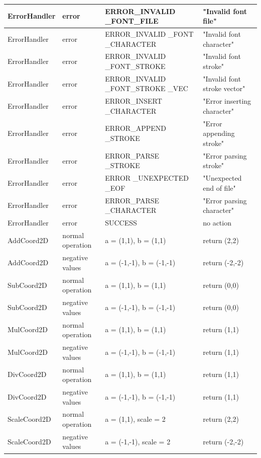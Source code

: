 \begin{longtable}{|>{\raggedright\arraybackslash}m{}|>{\raggedright\arraybackslash}m{}|>{\raggedright\arraybackslash}m{}|>{\raggedright\arraybackslash}m{}|}
        ErrorHandler & error & ERROR\_INVALID \_FONT\_FILE  & "Invalid font file" \\ \hline
        ErrorHandler & error & ERROR\_INVALID \_FONT \_CHARACTER  & "Invalid font character" \\ \hline
        ErrorHandler & error & ERROR\_INVALID \_FONT\_STROKE  & "Invalid font stroke" \\ \hline
        ErrorHandler & error & ERROR\_INVALID \_FONT\_STROKE \_VEC  & "Invalid font stroke vector" \\ \hline
        ErrorHandler & error & ERROR\_INSERT \_CHARACTER  & "Error inserting character" \\ \hline
        ErrorHandler & error & ERROR\_APPEND \_STROKE  & "Error appending stroke" \\ \hline
        ErrorHandler & error & ERROR\_PARSE \_STROKE  & "Error parsing stroke" \\ \hline
        ErrorHandler & error & ERROR \_UNEXPECTED \_EOF  & "Unexpected end of file" \\ \hline
        ErrorHandler & error & ERROR\_PARSE \_CHARACTER  & "Error parsing character" \\ \hline
        ErrorHandler & error & SUCCESS & no action \\ \hline
        AddCoord2D & normal operation & a = (1,1), b = (1,1) & return (2,2) \\ \hline
        AddCoord2D & negative values & a = (-1,-1), b = (-1,-1) & return (-2,-2) \\ \hline
        SubCoord2D & normal operation & a = (1,1), b = (1,1) & return (0,0) \\ \hline
        SubCoord2D & negative values & a = (-1,-1), b = (-1,-1) & return (0,0) \\ \hline
        MulCoord2D & normal operation & a = (1,1), b = (1,1) & return (1,1) \\ \hline
        MulCoord2D & negative values & a = (-1,-1), b = (-1,-1) & return (1,1) \\ \hline
        DivCoord2D & normal operation & a = (1,1), b = (1,1) & return (1,1) \\ \hline
        DivCoord2D & negative values & a = (-1,-1), b = (-1,-1) & return (1,1) \\ \hline
        ScaleCoord2D & normal operation & a = (1,1), scale = 2 & return (2,2) \\ \hline
        ScaleCoord2D & negative values & a = (-1,-1), scale = 2 & return (-2,-2) \\ \hline

\end{longtable}
